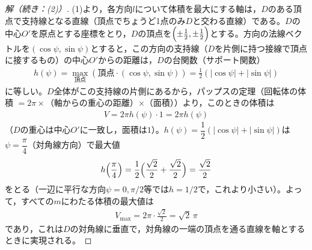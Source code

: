 \documentclass[../main.tex]{subfiles}
\begin{document}
\begin{proof}[解（続き：(2)）]
  (1)より，各方向$l$について体積を最大にする軸は，$D$のある頂点で支持線となる直線（頂点でちょうど1点のみ$D$と交わる直線）である。$D$の中心$O'$を原点とする座標をとり，$D$の頂点を$\Bigl(\pm\frac12,\pm\frac12\Bigr)$とする。方向の法線ベクトルを$(\cos\psi,\sin\psi)$とすると，この方向の支持線（$D$を片側に持つ接線で頂点に接するもの）の中心$O'$からの距離は，$D$の台関数（サポート関数）
  \begin{align*}
    h(\psi)=\max_{\text{頂点}}(\text{頂点}\cdot(\cos\psi,\sin\psi))=\frac12(|\cos\psi|+|\sin\psi|)
  \end{align*}
  に等しい。$D$全体がこの支持線の片側にあるから，パップスの定理（回転体の体積 $=2\pi\times$（軸からの重心の距離）$\times$（面積））より，このときの体積は
  \begin{align*}
    V=2\pi h(\psi)\cdot1=2\pi h(\psi)
  \end{align*}
  （$D$の重心は中心$O'$に一致し，面積は$1$）。$h(\psi)=\dfrac12(|\cos\psi|+|\sin\psi|)$は$\psi=\dfrac\pi4$（対角線方向）で最大値
  \begin{align*}
    h\Bigl(\frac\pi4\Bigr)=\frac12\Bigl(\frac{\sqrt2}2+\frac{\sqrt2}2\Bigr)=\frac{\sqrt2}2
  \end{align*}
  をとる（一辺に平行な方向$\psi=0,\pi/2$等では$h=1/2$で，これより小さい）。よって，すべての$m$にわたる体積の最大値は
  \begin{align*}
    V_{\max}=2\pi\cdot\frac{\sqrt2}2=\sqrt2\,\pi
  \end{align*}
  であり，これは$D$の対角線に垂直で，対角線の一端の頂点を通る直線を軸とするときに実現される。
\end{proof}
\end{document}
